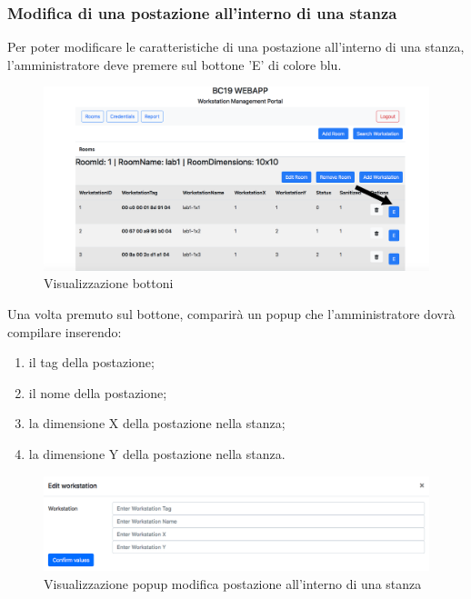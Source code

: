 \subsubsection{Modifica di una postazione all'interno di una stanza}
Per poter modificare le caratteristiche di una postazione all'interno di una stanza, l'amministratore deve premere sul bottone 'E' di colore blu.
\begin{figure}[H]
	\centering
	\includegraphics[width=15cm]{res/images/bottoneEditWorkstation.png}
	\caption{Visualizzazione bottoni}
\end{figure}
Una volta premuto sul bottone, comparirà un popup che l'amministratore dovrà compilare inserendo:
\begin{enumerate}
	\item il tag della postazione;
	\item il nome della postazione;
	\item la dimensione X della postazione nella stanza;
	\item la dimensione Y della postazione nella stanza.
\end{enumerate}
\begin{figure}[H]
	\centering
	\includegraphics[width=15cm]{res/images/editWorkstation.png}
	\caption{Visualizzazione popup modifica postazione all'interno di una stanza}
\end{figure}

